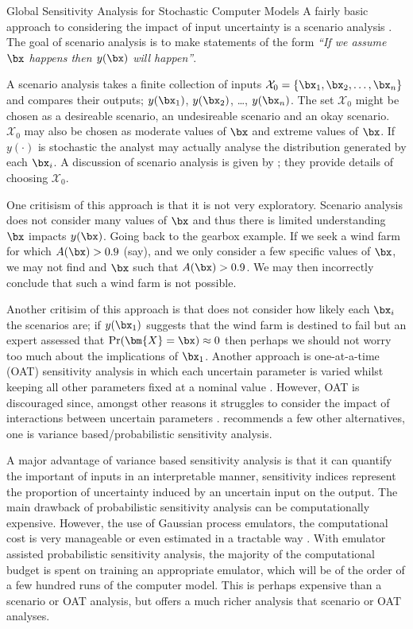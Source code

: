 \begin{chapter}{Global Sensitivity Analysis for Stochastic Computer Models}
A fairly basic approach to considering the impact of input uncertainty is a scenario analysis \citep{Zhang2012, Grewal2013}. The goal of scenario analysis is to make statements of the form \textit{``If we assume $\bx$ happens then $y(\bx)$ will happen''}.

A scenario analysis takes a finite collection of inputs $\mathcal{X}_0 = \{ \bx_1, \bx_2, \ldots, \bx_n\}$  and compares their outputs; $y(\bx_1)$, $y(\bx_2)$, \ldots, $y(\bx_n)$. The set $\mathcal{X}_0$ might be chosen as a desireable scenario, an undesireable scenario and an okay scenario. $\mathcal{X}_0$ may also be chosen as moderate values of $\bx$ and extreme values of $\bx$. If $y(\cdot)$ is stochastic the analyst may actually analyse the distribution generated by each $\bx_i$. A discussion of scenario analysis is given by \citet{Wheatcroft2019}; they provide details of choosing $\mathcal{X}_0$.

One critisism of this approach is that it is not very exploratory. Scenario analysis does not consider many values of $\bx$ and thus there is limited understanding $\bx$ impacts $y(\bx)$. Going back to the gearbox example. If we seek a wind farm for which $A(\bx) > 0.9$ (say), and we only consider a few specific values of $\bx$, we may not find and $\bx$ such that $A(\bx) >  0.9$. We may then incorrectly conclude that such a wind farm is not possible.

Another critisim of this approach is that does not consider how likely each $\bx_i$ the scenarios are; if $y(\bx_1)$ suggests that the wind farm is destined to fail but an expert assessed that $\Pr (\bm{X} = \bx) \approx 0$ then perhaps we should not worry too much about the implications of $\bx_1$. Another approach is one-at-a-time (OAT) sensitivity analysis in which each uncertain parameter is varied whilst keeping all other parameters fixed at a nominal value \citep{Holvoet2005}. However, OAT is discouraged since, amongst other reasons it struggles to consider the impact of interactions between uncertain parameters \citep{Saltelli2010}. \citet{Saltelli2010} recommends a few other alternatives, one is variance based/probabilistic sensitivity analysis. 

A major advantage of variance based sensitivity analysis is that it can quantify the important of inputs in an interpretable manner, sensitivity indices represent the proportion of uncertainty induced by an uncertain input on the output. The main drawback of probabilistic sensitivity analysis can be computationally expensive. However, the use of Gaussian process emulators, the computational cost is very manageable \cite{Becker2012} or even estimated in a tractable way \citep{Oakley04}. With emulator assisted probabilistic sensitivity analysis, the majority of the computational budget is spent on training an appropriate emulator, which will be of the order of a few hundred runs of the computer model. This is perhaps expensive than a scenario or OAT analysis, but offers a much richer analysis that scenario or OAT analyses.


\end{chapter}
